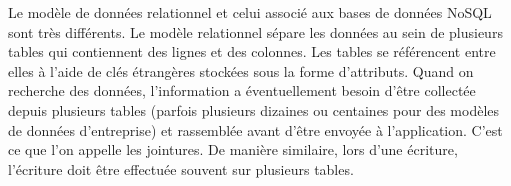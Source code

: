 Le modèle de données relationnel et celui associé aux bases de données NoSQL sont très différents. Le modèle relationnel sépare les données au sein de plusieurs tables qui contiennent des lignes et des colonnes. Les tables se référencent entre elles à l'aide de clés étrangères stockées sous la forme d'attributs. Quand on recherche des données, l'information a éventuellement besoin d'être collectée depuis plusieurs tables (parfois plusieurs dizaines ou centaines pour des modèles de données d'entreprise) et rassemblée avant d'être envoyée à l'application. C'est ce que l'on appelle les jointures. De manière similaire, lors d'une écriture, l'écriture doit être effectuée souvent sur plusieurs tables.\\




